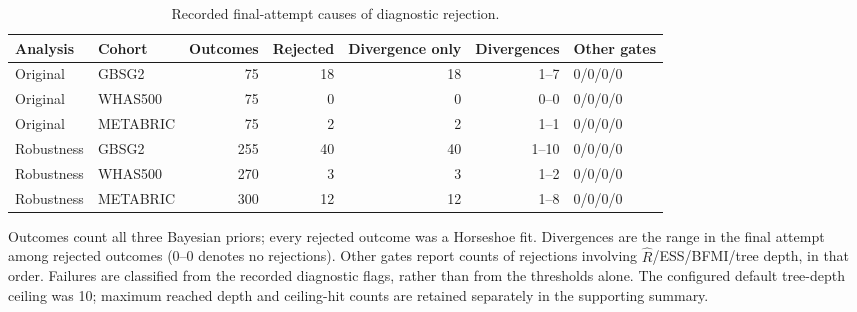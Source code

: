 \begin{table}[htbp]
\centering
\begingroup\singlespacing\footnotesize
\setlength{\tabcolsep}{3pt}
\caption{Recorded final-attempt causes of diagnostic rejection.}\label{tab:exam-diagnostic-failures}
\begin{adjustbox}{max width=\textwidth}
\begin{tabular}{@{}llrrrrl@{}}
\toprule Analysis & Cohort & Outcomes & Rejected & Divergence only & Divergences & Other gates\\\midrule
Original & GBSG2 & 75 & 18 & 18 & 1--7 & 0/0/0/0\\
Original & WHAS500 & 75 & 0 & 0 & 0--0 & 0/0/0/0\\
Original & METABRIC & 75 & 2 & 2 & 1--1 & 0/0/0/0\\
Robustness & GBSG2 & 255 & 40 & 40 & 1--10 & 0/0/0/0\\
Robustness & WHAS500 & 270 & 3 & 3 & 1--2 & 0/0/0/0\\
Robustness & METABRIC & 300 & 12 & 12 & 1--8 & 0/0/0/0\\
\bottomrule
\end{tabular}
\end{adjustbox}
\par\smallskip
\begin{minipage}{\textwidth}
Outcomes count all three Bayesian priors; every rejected outcome was a Horseshoe fit. Divergences are the range in the final attempt among rejected outcomes (0--0 denotes no rejections). Other gates report counts of rejections involving $\widehat R$/ESS/BFMI/tree depth, in that order. Failures are classified from the recorded diagnostic flags, rather than from the thresholds alone. The configured default tree-depth ceiling was 10; maximum reached depth and ceiling-hit counts are retained separately in the supporting summary.
\end{minipage}
\endgroup
\end{table}
